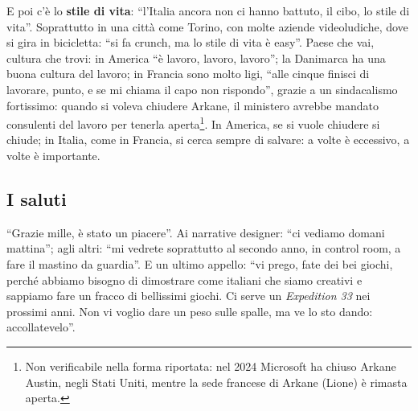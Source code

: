 E poi c'è lo \textbf{stile di vita}: ``l'Italia ancora non ci hanno battuto, il
cibo, lo stile di vita''. Soprattutto in una città come Torino, con molte
aziende videoludiche, dove si gira in bicicletta: ``si fa crunch, ma lo stile di
vita è easy''. Paese che vai, cultura che trovi: in America ``è lavoro, lavoro,
lavoro''; la Danimarca ha una buona cultura del lavoro; in Francia sono molto
ligi, ``alle cinque finisci di lavorare, punto, e se mi chiama il capo non
rispondo'', grazie a un sindacalismo fortissimo: quando si voleva chiudere
Arkane, il ministero avrebbe mandato consulenti del lavoro per tenerla
aperta\footnote{Non verificabile nella forma riportata: nel 2024 Microsoft ha
chiuso Arkane Austin, negli Stati Uniti, mentre la sede francese di Arkane
(Lione) è rimasta aperta.}. In America, se si vuole chiudere si chiude; in
Italia, come in Francia, si cerca sempre di salvare: a volte è eccessivo, a
volte è importante.

\subsection{I saluti}

``Grazie mille, è stato un piacere''. Ai narrative designer: ``ci vediamo domani
mattina''; agli altri: ``mi vedrete soprattutto al secondo anno, in control
room, a fare il mastino da guardia''. E un ultimo appello: ``vi prego, fate dei
bei giochi, perché abbiamo bisogno di dimostrare come italiani che siamo
creativi e sappiamo fare un fracco di bellissimi giochi. Ci serve un
\emph{Expedition 33} nei prossimi anni. Non vi voglio dare un peso sulle spalle,
ma ve lo sto dando: accollatevelo''.

